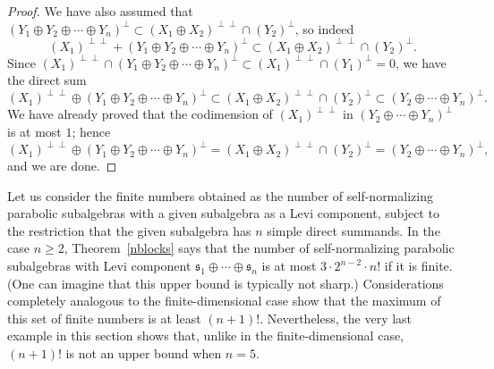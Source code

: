 \documentclass{amsart}
\theoremstyle{definition}
\theoremstyle{remark}
\numberwithin{equation}{section}
\def\s{\mathfrak{s}}
\begin{document}
\begin{proof}
We have also assumed that $(Y_1 \oplus Y_2 \oplus \cdots \oplus Y_n)^\perp \subset (X_1 \oplus X_2)^{\perp \perp} \cap (Y_2)^\perp$, so indeed $$(X_1)^{\perp \perp} + (Y_1 \oplus Y_2 \oplus \cdots \oplus Y_n)^\perp \subset (X_1 \oplus X_2)^{\perp \perp} \cap (Y_2)^\perp.$$  Since $(X_1)^{\perp \perp}  \cap (Y_1 \oplus Y_2 \oplus \cdots \oplus Y_n)^\perp \subset (X_1)^{\perp \perp} \cap (Y_1)^\perp = 0$, we have the direct sum 
$$(X_1)^{\perp \perp} \oplus (Y_1 \oplus Y_2 \oplus \cdots \oplus Y_n)^\perp \subset (X_1 \oplus X_2)^{\perp \perp} \cap (Y_2)^\perp \subset (Y_2 \oplus \cdots \oplus Y_n)^\perp.$$ 
We have already proved that the codimension of $(X_1)^{\perp \perp}$ in  $(Y_2 \oplus \cdots \oplus Y_n)^\perp$ is at most $1$; hence
$$(X_1)^{\perp \perp} \oplus (Y_1 \oplus Y_2 \oplus \cdots \oplus Y_n)^\perp = (X_1 \oplus X_2)^{\perp \perp} \cap (Y_2)^\perp = (Y_2 \oplus \cdots \oplus Y_n)^\perp,$$
and we are done. 
\end{proof}

Let us consider the finite numbers obtained as the number of self-normalizing parabolic subalgebras with a given subalgebra as a Levi component, subject to the restriction that the given subalgebra has $n$ simple direct summands.  In the case $n \geq 2$, Theorem~\ref{nblocks} says that the number of self-normalizing parabolic subalgebras with Levi component $\s_1 \oplus \cdots \oplus \s_n$ is at most $3 \cdot 2^{n-2} \cdot n!$ if it is finite.   (One can imagine that this upper bound is typically not sharp.)  Considerations completely analogous to the finite-dimensional case show that the maximum of this set of finite numbers is at least $(n+1)!$.   Nevertheless, the very last example in this section shows that, unlike in the finite-dimensional case, $(n+1)!$ is not an upper bound when $n=5$.
\end{document}
